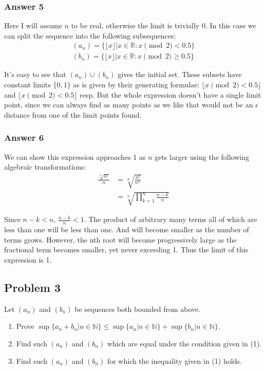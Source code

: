 \documentclass[11pt]{article}
\begin{document}
\subsubsection{Answer 5}
\label{sec-1-2-3}
Here I will assume $n$ to be real, otherwise the limit is trivially 0.
In this case we can split the sequence into the following subsequences:
\begin{equation*}
  \begin{aligned}
    (a_n) = \{\lfloor x \rfloor | x \in \mathbb{R}: x \pmod 2 < 0.5 \} \\
    (b_n) = \{\lfloor x \rfloor | x \in \mathbb{R}: x \pmod 2 \geq 0.5 \}
  \end{aligned}
\end{equation*}

It's easy to see that $(a_n) \cup (b_n)$ gives the initial set.  These
subsets have constant limits $\{0, 1\}$ as is given by their generating
formulae: $\lfloor x \pmod 2 < 0.5 \rfloor$ and $\lfloor x \pmod 2 < 0.5
    \rfloor$ resp.  But the whole expression doesn't have a single limit point,
since we can always find as many points as we like that would not be an
$\epsilon$ distance from one of the limit points found.
\subsubsection{Answer 6}
\label{sec-1-2-4}
We can show this expression approaches 1 as $n$ gets larger using the
following algebraic transformations:
\begin{equation*}
  \begin{aligned}
    \frac{\sqrt[n]{n!}}{n} &= \sqrt[n]{\frac{n!}{n^n}} \\
                           &= \sqrt[n]{\prod_{k=1}^n\frac{n - k}{n}}
  \end{aligned}
\end{equation*}

Since $n - k < n$, $\frac{n - k}{n} < 1$.  The product of arbitrary many
terms all of which are less than one will be less than one.  And will
become smaller as the number of terms grows.  However, the nth root
will become progressively large as the fractional term becomes smaller,
yet never exceeding 1.  Thus the limit of this expression is 1.
\subsection{Problem 3}
\label{sec-1-3}
Let $(a_n)$ and $(b_n)$ be sequences both bounded from above.
\begin{enumerate}
\item Prove $\sup \{a_n + b_n | n \in \mathbb{N}\} \leq \sup
      \{a_n | n \in \mathbb{N}\} + \sup \{b_n | n \in \mathbb{N}\}$.
\item Find such $(a_n)$ and $(b_n)$ which are equal under the condition
given in (1).
\item Find such $(a_n)$ and $(b_n)$ for which the inequality given in
(1) holds.
\end{enumerate}
\end{document}
